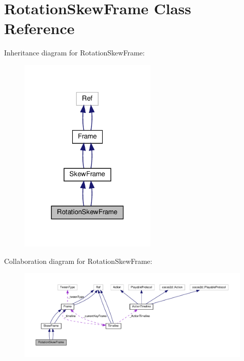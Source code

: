 \hypertarget{classRotationSkewFrame}{}\section{Rotation\+Skew\+Frame Class Reference}
\label{classRotationSkewFrame}


Inheritance diagram for Rotation\+Skew\+Frame\+:
\nopagebreak
\begin{figure}[H]
\begin{center}
\leavevmode
\includegraphics[width=186pt]{classRotationSkewFrame__inherit__graph}
\end{center}
\end{figure}


Collaboration diagram for Rotation\+Skew\+Frame\+:
\nopagebreak
\begin{figure}[H]
\begin{center}
\leavevmode
\includegraphics[width=350pt]{classRotationSkewFrame__coll__graph}
\end{center}
\end{figure}
